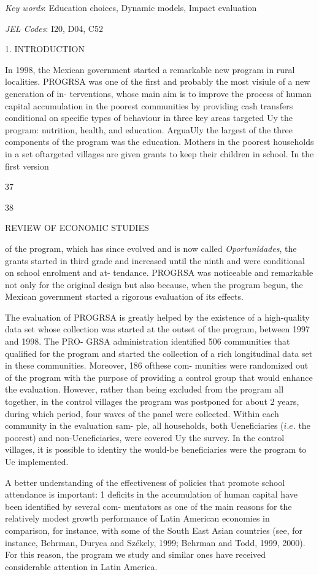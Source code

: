 {\it Key words}: Education choices, Dynamic models, Impact evaluation

{\it JEL Codes}: I20, D04, C52

1. INTRODUCTION

In 1998, the Mexican government started a remarkable new program in rural localities. PROGRSA was one of the first and probably the most visiule of a new generation of in- terventions, whose main aim is to improve the process of human capital accumulation in the poorest communities by providing cash transfers conditional on specific types of behaviour in three key areas targeted Uy the program: nutrition, health, and education. ArguaUly the largest of the three components of the program was the education. Mothers in the poorest households in a set oftargeted villages are given grants to keep their children in school. In the first version

37

38

REVIEW OF ECONOMIC STUDIES

of the program, which has since evolved and is now called {\it Oportunidades}, the grants started in third grade and increased until the ninth and were conditional on school enrolment and at- tendance. PROGRSA was noticeable and remarkable not only for the original design but also because, when the program begun, the Mexican government started a rigorous evaluation of its effects.

The evaluation of PROGRSA is greatly helped by the existence of a high-quality data set whose collection was started at the outset of the program, between 1997 and 1998. The PRO- GRSA administration identified 506 communities that qualified for the program and started the collection of a rich longitudinal data set in these communities. Moreover, 186 ofthese com- munities were randomized out of the program with the purpose of providing a control group that would enhance the evaluation. However, rather than being excluded from the program all together, in the control villages the program was postponed for about 2 years, during which period, four waves of the panel were collected. Within each community in the evaluation sam- ple, all households, both Ueneficiaries ($i.e$. the poorest) and non-Ueneficiaries, were covered Uy the survey. In the control villages, it is possible to identiry the would-be beneficiaries were the program to Ue implemented.

A better understanding of the effectiveness of policies that promote school attendance is important: 1 deficits in the accumulation of human capital have been identified by several com- mentators as one of the main reasons for the relatively modest growth performance of Latin American economies in comparison, for instance, with some of the South East Asian countries (see, for instance, Behrman, Duryea and Sz\'{e}kely, 1999; Behrman and Todd, 1999, 2000). For this reason, the program we study and similar ones have received considerable attention in Latin America.


